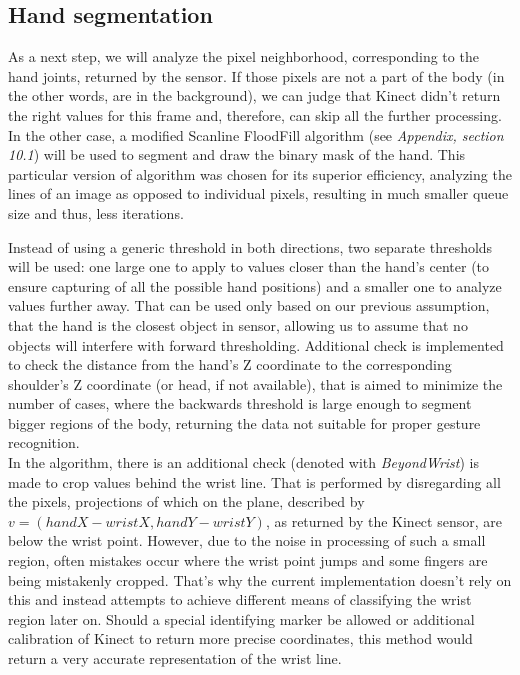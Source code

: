 \documentclass[a4paper,11pt,oneside]{article}
\begin{document}
\subsection{Hand segmentation}

As a next step, we will analyze the pixel neighborhood, corresponding to the hand joints, returned by the sensor. If those pixels are not a part of the body (in the other words, are in the background), we can judge that Kinect didn't return the right values for this frame and, therefore, can skip all the further processing. In the other case, a modified Scanline FloodFill algorithm (see \textit{Appendix, section 10.1}) will be used to segment and draw the binary mask of the hand. This particular version of algorithm was chosen for its superior efficiency, analyzing the lines of an image as opposed to individual pixels, resulting in much smaller queue size and thus, less iterations.

Instead of using a generic threshold in both directions, two separate thresholds will be used: one large one to apply to values closer than the hand's center (to ensure capturing of all the possible hand positions) and a smaller one to analyze values further away. That can be used only based on our previous assumption, that the hand is the closest object in sensor, allowing us to assume that no objects will interfere with forward thresholding. Additional check is implemented to check the distance from the hand's Z coordinate to the corresponding shoulder's Z coordinate (or head, if not available), that is aimed to minimize the number of cases, where the backwards threshold is large enough to segment bigger regions of the body, returning the data not suitable for proper gesture recognition.\\

In the algorithm, there is an additional check (denoted with \textit{BeyondWrist}) is made to crop values behind the wrist line. That is performed by disregarding all the pixels, projections of which on the plane, described by $v = (handX - wristX, handY - wristY)$, as returned by the Kinect sensor, are below the wrist point. However, due to the noise in processing of such a small region, often mistakes occur where the wrist point jumps and some fingers are being mistakenly cropped. That's why the current implementation doesn't rely on this and instead attempts to achieve different means of classifying the wrist region later on. Should a special identifying marker be allowed or additional calibration of Kinect  to return more precise coordinates, this method would return a very accurate representation of the wrist line.
\end{document}
